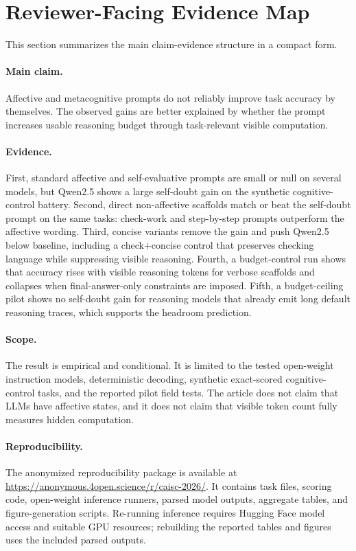 \documentclass{article}
\begin{document}
\clearpage
\section{Reviewer-Facing Evidence Map}

This section summarizes the main claim-evidence structure in a compact form.

\paragraph{Main claim.}
Affective and metacognitive prompts do not reliably improve task accuracy by themselves. The observed gains are better explained by whether the prompt increases usable reasoning budget through task-relevant visible computation.

\paragraph{Evidence.}
First, standard affective and self-evaluative prompts are small or null on several models, but Qwen2.5 shows a large self-doubt gain on the synthetic cognitive-control battery. Second, direct non-affective scaffolds match or beat the self-doubt prompt on the same tasks: check-work and step-by-step prompts outperform the affective wording. Third, concise variants remove the gain and push Qwen2.5 below baseline, including a check+concise control that preserves checking language while suppressing visible reasoning. Fourth, a budget-control run shows that accuracy rises with visible reasoning tokens for verbose scaffolds and collapses when final-answer-only constraints are imposed. Fifth, a budget-ceiling pilot shows no self-doubt gain for reasoning models that already emit long default reasoning traces, which supports the headroom prediction.

\paragraph{Scope.}
The result is empirical and conditional. It is limited to the tested open-weight instruction models, deterministic decoding, synthetic exact-scored cognitive-control tasks, and the reported pilot field tests. The article does not claim that LLMs have affective states, and it does not claim that visible token count fully measures hidden computation.

\paragraph{Reproducibility.}
The anonymized reproducibility package is available at \url{https://anonymous.4open.science/r/caisc-2026/}. It contains task files, scoring code, open-weight inference runners, parsed model outputs, aggregate tables, and figure-generation scripts. Re-running inference requires Hugging Face model access and suitable GPU resources; rebuilding the reported tables and figures uses the included parsed outputs.
\end{document}
